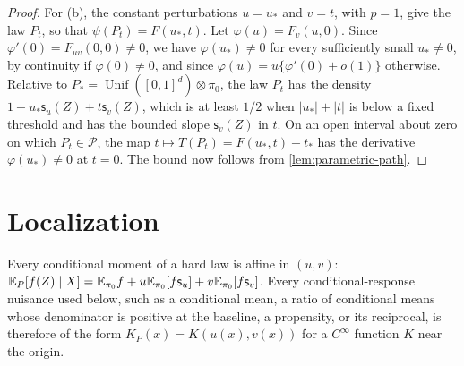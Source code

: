 \begin{proof}
For (b), the constant perturbations $u=u_*$ and $v=t$, with $p=1$, give
the law $P_t$, so that $\psi(P_t)=F(u_*,t)$. Let $\varphi(u)=F_v(u,0)$.
Since $\varphi'(0)=F_{uv}(0,0)\ne0$, we have $\varphi(u_*)\ne0$ for
every sufficiently small $u_*\ne0$, by continuity if $\varphi(0)\ne0$,
and since $\varphi(u)=u\{\varphi'(0)+o(1)\}$ otherwise. Relative to
$P_*=\operatorname{Unif}([0,1]^d)\otimes\pi_0$, the law $P_t$ has the
density $1+u_*\mathsf s_u(Z)+t\mathsf s_v(Z)$, which is at least $1/2$
when $|u_*|+|t|$ is below a fixed threshold and has the bounded slope
$\mathsf s_v(Z)$ in $t$. On an open interval about zero on which
$P_t\in\mathcal P$, the map $t\mapsto T(P_t)=F(u_*,t)+t_*$ has the
derivative $\varphi(u_*)\ne0$ at $t=0$. The bound now follows from
\cref{lem:parametric-path}.
\end{proof}

\section{Localization}\label{sec:hard-laws}

Every conditional moment of a hard law is affine in $(u,v)$:
$\mathbb E_P[f(Z)\mid X]=\mathbb E_{\pi_0}f+u\mathbb E_{\pi_0}[f\mathsf s_u]+v\mathbb E_{\pi_0}[f\mathsf s_v]$.
Every conditional-response nuisance used below, such as a conditional
mean, a ratio of conditional means whose denominator is positive at the
baseline, a propensity, or its reciprocal, is therefore of the form
$K_P(x)=K(u(x),v(x))$ for a $C^\infty$ function $K$ near the origin.

